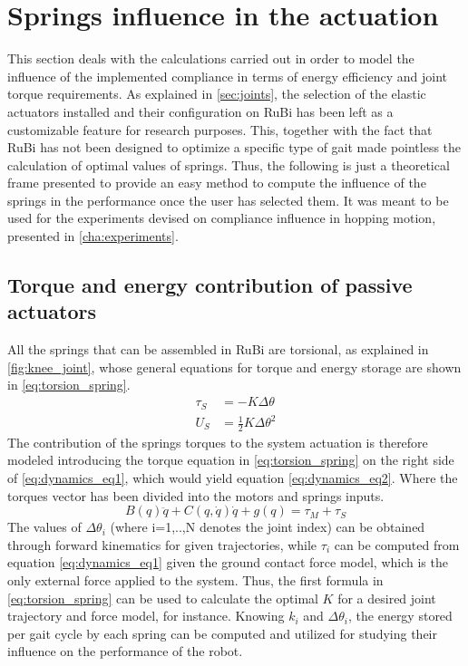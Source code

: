 
\section{Springs influence in the actuation}
\label{sec_springs}
This section deals with the calculations carried out in order to model the influence of the implemented compliance in terms of energy efficiency and joint torque requirements.
As explained in \ref{sec:joints}, the selection of the elastic actuators installed and their configuration on RuBi has been left as a customizable feature for research purposes.
This, together with the fact that RuBi has not been designed to optimize a specific type of gait made pointless the calculation of optimal values of springs.
Thus, the following is just a theoretical frame presented to provide an easy method to compute the influence of the springs in the performance once the user has selected them.
It was meant to be used for the experiments devised on compliance influence in hopping motion, presented in \ref{cha:experiments}.

\subsection{Torque and energy contribution of passive actuators} %
\label{sub:torque_contribution_of_passive_actuators}
All the springs that can be assembled in RuBi are torsional, as explained in \ref{fig:knee_joint}, whose general equations for torque and energy storage are shown in \ref{eq:torsion_spring}. 
\begin{equation}
\label{eq:torsion_spring}
\begin{aligned}
	\tau_{S} &= -K \Delta \theta \\
	U_{S} &= \frac{1}{2}K \Delta \theta^2
\end{aligned}
\end{equation}
The contribution of the springs torques to the system actuation is therefore modeled introducing the torque equation in \ref{eq:torsion_spring} on the right side of \ref{eq:dynamics_eq1}, which would yield equation \ref{eq:dynamics_eq2}.
Where the torques vector has been divided into the motors and springs inputs.
\begin{equation}
	\label{eq:dynamics_eq2}
	B(q)\ddot{q} + C(q,\dot{q})\dot{q} + g(q) = \tau_{M} + \tau_{S}
\end{equation}
The values of $\Delta \theta_{i}$ (where i=1,..,N denotes the joint index) can be obtained through forward kinematics for given trajectories, while $\tau_{i}$ can be computed from equation \ref{eq:dynamics_eq1} given the ground contact force model, which is the only external force applied to the system.
Thus, the first formula in \ref{eq:torsion_spring} can be used to calculate the optimal $K$ for a desired joint trajectory and force model, for instance.
Knowing $k_{i}$ and $\Delta \theta_{i}$, the energy stored per gait cycle by each spring can be computed and utilized for studying their influence on the performance of the robot.


